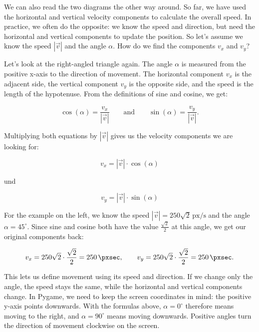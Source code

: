 We can also read the two diagrams the other way around. So far, we have used the horizontal and vertical velocity components to calculate the overall speed. In practice, we often do the opposite: we know the speed and direction, but need the horizontal and vertical components to update the position. So let's assume we know the speed $|\vec v|$ and the angle $\alpha$. How do we find the components $v_x$ and $v_y$?

Let's look at the right-angled triangle again. The angle $\alpha$ is measured from the positive x-axis to the direction of movement. The horizontal component $v_x$ is the adjacent side, the vertical component $v_y$ is the opposite side, and the speed is the length of the hypotenuse. From the definitions of sine and cosine, we get:

\[
\cos(\alpha)=\frac{v_x}{|\vec v|}
\qquad\text{and}\qquad
\sin(\alpha)=\frac{v_y}{|\vec v|}.
\]

Multiplying both equations by $|\vec v|$ gives us the velocity components we are looking for:

\begin{minipage}{0.44\linewidth}
	\begin{equation}
		\boxed{v_x=|\vec v|\cdot\cos(\alpha)}
		\label{eqn_vx}
	\end{equation}
\end{minipage}%
\hfill
\begin{minipage}{0.08\linewidth}
	\centering
	und
\end{minipage}%
\hfill
\begin{minipage}{0.44\linewidth}
	\begin{equation}
		\boxed{v_y=|\vec v|\cdot\sin(\alpha)}
		\label{eqn_vy}
	\end{equation}
\end{minipage}

For the example on the left, we know the speed $|\vec v|=250\sqrt{2}\,\mathrm{px/s}$ and the angle $\alpha=45^\circ$. Since sine and cosine both have the value $\frac{\sqrt{2}}{2}$ at this angle, we get our original components back:

\[
v_x=250\sqrt{2}\cdot\frac{\sqrt{2}}{2}=\SI{250}{\pxsec},
\qquad
v_y=250\sqrt{2}\cdot\frac{\sqrt{2}}{2}=\SI{250}{\pxsec}.
\]

This lets us define movement using its speed and direction. If we change only the angle, the speed stays the same, while the horizontal and vertical components change.
In Pygame, we need to keep the screen coordinates in mind: the positive y-axis points downwards. With the formulas above, $\alpha=0^\circ$ therefore means moving to the right, and $\alpha=90^\circ$ means moving downwards. Positive angles turn the direction of movement clockwise on the screen.

